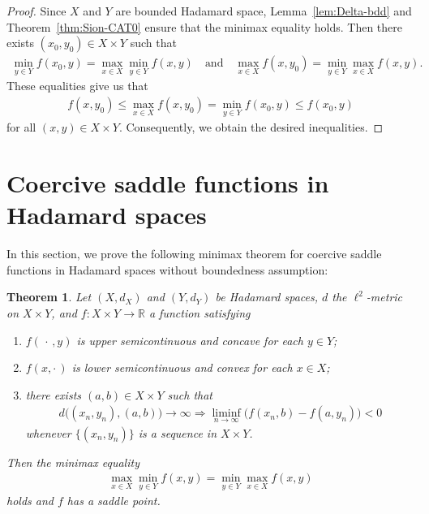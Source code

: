 \documentclass[draft]{amsart}
\numberwithin{equation}{section}
\def\R{\mathbb R}
\theoremstyle{plain}
\newtheorem{theorem}{Theorem}[section]
\theoremstyle{definition}
\theoremstyle{remark}
\begin{document}
\begin{proof}
 Since $X$ and $Y$ are bounded Hadamard space, 
 Lemma~\ref{lem:Delta-bdd} 
 and Theorem~\ref{thm:Sion-CAT0} ensure that the minimax 
 equality holds. Then there exists $(x_0,y_0) \in X\times Y$ such that 
 \begin{align}
 \min_{y\in Y}f(x_0,y) = 
  \max_{x\in X}\min_{y\in Y} f(x,y) 
 \quad 
 \textrm{and}
 \quad 
 \max_{x\in X} f(x,y_0)= \min_{y\in Y} \max_{x\in X} f(x,y). 
 \end{align}
 These equalities give us that 
 \begin{align}
  f(x,y_0) \leq \max_{x\in X}f(x, y_0) 
 =\min_{y\in Y}f(x_0,y) \leq f(x_0,y)
 \end{align}
 for all $(x,y)\in X\times Y$. 
 Consequently, we obtain the desired inequalities. 
\end{proof}

\section{Coercive saddle functions in Hadamard spaces}\label{sec:coercive}

In this section, we prove the following minimax theorem 
for coercive saddle functions in Hadamard spaces 
without boundedness assumption: 

\begin{theorem}\label{thm:minimax-coercive}
 Let $(X,d_X)$ and $(Y,d_Y)$ be Hadamard spaces, 
 $d$ the $\ell^2$-metric on $X\times Y$, 
 and $f\colon X\times Y\to \R$ a function satisfying 
 \begin{enumerate}
  \item[(i)] $f(\,\cdot\,,y)$ is upper semicontinuous 
 and concave for each $y\in Y$; 
  \item[(ii)] $f(x,\cdot \,)$ is lower semicontinuous 
 and convex for each $x\in X$; 
  \item[(iii)] there exists $(a,b)\in X\times Y$ such that 
 \begin{align}
  d\bigl((x_n,y_n), (a,b)\bigr)\to \infty 
  \Rightarrow \liminf_{n\to \infty}\bigl(
  f(x_n, b) - f(a, y_n)\bigr) <0
 \end{align}
 whenever $\{(x_n,y_n)\}$ is a sequence in $X\times Y$. 
 \end{enumerate}
 Then the minimax equality 
 \begin{align}
  \max_{x\in X}\min_{y\in Y} f(x,y)=\min_{y\in Y} \max_{x\in X} f(x,y) 
 \end{align}
 holds and $f$ has a saddle point. 
\end{theorem}
\end{document}
